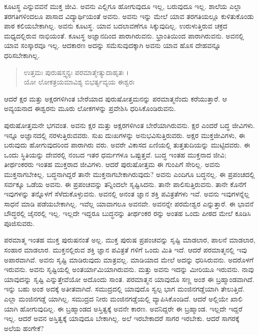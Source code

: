 ಕೂಟಸ್ಥ ಎನ್ನುವವನೆ ಮುಕ್ತ ಜೀವಿ. ಅವನು ಎಲ್ಲಿಗೂ ಹೋಗುವುದೂ ಇಲ್ಲ, ಬರುವುದೂ ಇಲ್ಲ. ಶಾಲೆಯ ಎಲ್ಲಾ ತರಗತಿಗಳಿಂದಲೂ ಪಾಸಾದ ವಿದ್ಯಾರ್ಥಿಯಂತೆ ಅವನು. ಅವನು ಇನ್ನು ಮೇಲೆ ಯಾವ ತರಗತಿಯಲ್ಲೂ ಕುಳಿತುಕೊಂಡು ಪಾಠ ಕಲಿಯಬೇಕಾಗಿಲ್ಲ. ಅವನು ಕೂಟಸ್ಥ. ಯಾವ ಬದಲಾವಣೆಗೂ ಸಿಕ್ಕುವುದಿಲ್ಲ. ಉರುಳುತ್ತಿರುವ ಚಕ್ರದ ಮಧ್ಯದಲ್ಲಿರುವ ನಾಭಿಯಂತೆ. ಕೂಟಸ್ಥ ಅಜ್ಞಾನದಿಂದ ಪಾರಾಗಿರುವನು. ಭ್ರಾಂತಿಯಿಂದ ಪಾರಾಗಿರುವನು. ಅವನಲ್ಲಿ ಯಾವ ಸಂಸ್ಕಾರವೂ ಇಲ್ಲ. ಆದಕಾರಣ ಅದನ್ನು ಸಮೆಸುವುದಕ್ಕಾಗಿ ಅವನು ಯಾವ ಹೊಸ ದೇಹವನ್ನೂ ಧರಿಸಬೇಕಾಗಿಲ್ಲ.

\begin{verse}
ಉತ್ತಮಃ ಪುರುಷಸ್ತ್ವನ್ಯಃ ಪರಮಾತ್ಮೇತ್ಯುದಾಹೃತಃ ।\\ಯೋ ಲೋಕತ್ರಯಮಾವಿಶ್ಯ ಬಿಭರ್ತ್ಯವ್ಯಯ ಈಶ್ವರಃ 
\end{verse}

{\small ಆದರೆ ಕ್ಷರ ಮತ್ತು ಅಕ್ಷರಗಳಿಗಿಂತ ಬೇರೆಯಾದ ಪುರುಷೋತ್ತಮನನ್ನು ಪರಮಾತ್ಮನೆಂದು ಕರೆಯುತ್ತಾರೆ. ಆ ಅವ್ಯಯನಾದ ಈಶ್ವರನು ಮೂರು ಲೋಕಗಳನ್ನು ಪ್ರವೇಶಿಸಿ ಧರಿಸಿಕೊಂಡಿರುವನು.}

ಪುರುಷೋತ್ತಮನೇ ಭಗವಂತ. ಅವನು ಕ್ಷರ ಮತ್ತು ಅಕ್ಷರಗಳಿಗಿಂತ ಬೇರೆಯಾಗಿರುವನು. ಕ್ಷರ ಎಂದರೆ ಬದ್ಧ ಜೀವಿಗಳು. ಇನ್ನೂ ಅಜ್ಞಾನದಲ್ಲಿ ನರಳುತ್ತಿರುವವರು. ಸುಖ ದುಃಖಗಳನ್ನು ಅನುಭವಿಸುತ್ತಿರುವರು. ಅಕ್ಷರ ಮುಕ್ತಜೀವಿಗಳು, ಈ ಬರುವುದು ಹೋಗುವುದರಿಂದ ಪಾರಾಗಿರು ವರು. ಅವರೇ ವಿಕಾಸದ ಏಣಿಯಲ್ಲಿ ತುತ್ತತುದಿಯನ್ನು ಮುಟ್ಟಿದವರು. ಈ ಒಂದು ಸ್ಥಿತಿಯನ್ನು ದೇವರಲ್ಲಿ ನಂಬದ ಇತರ ಧರ್ಮಗಳೂ ಒಪ್ಪುತ್ತವೆ. ಬುದ್ಧ ಇಂತಹ ಮುಕ್ತನಾದ ಜೀವಿ; ತೀರ್ಥಂಕರರು ಇಂತಹ ಮುಕ್ತರಾದ ಜೀವಿಗಳು. ಆದರೆ ಪುರುಷೋತ್ತಮ ಈ ಗುಂಪಿಗೆ ಸೇರಿಲ್ಲ. ಅವನು ಮುಕ್ತನಾಗಬೇಕಿಲ್ಲ. ಬದ್ಧನಾಗಿದ್ದರೆ ತಾನೇ ಮುಕ್ತನಾಗಬೇಕಾಗಿರುವುದು? ಅವನು ಎಂದಿಗೂ ಬದ್ಧನಲ್ಲ. ಈ ಪ್ರಪಂಚದಲ್ಲಿ ಸರ್ವಕ್ಕೂ ಒಡೆಯ ಅವನು. ಈ ಪ್ರಪಂಚವನ್ನು ತನ್ನಿಂದಲೇ ಸೃಷ್ಟಿಸಿದನು. ತಾನೇ ಪಾಲಿಸುತ್ತಿರುವನು. ತಾನೇ ಕೊನೆಗೆ ಇವುಗಳನ್ನು ತನ್ನೊಳಗೆ ಸೆಳೆದುಕೊಳ್ಳುವನು. ಅವನಲ್ಲಿ ಅನಂತ ಜ್ಞಾನ ಶಕ್ತಿ ಪವಿತ್ರತೆಗಳು ಇವೆ. ಅವನು ಇವುಗಳನ್ನೆಲ್ಲ ಸಾಧನೆ ಮಾಡಿ ಪಡೆಯಬೇಕಾಗಿಲ್ಲ. ಇವೆಲ್ಲ ಯಾವಾಗಲೂ ಅವನವೇ. ಅವನನ್ನೇ ಪರಮೇಶ್ವರ ಎನ್ನುತ್ತಾರೆ. ಈ ಭಾವನೆ ಬೌದ್ಧರಲ್ಲಿ ಜೈನರಲ್ಲಿ ಇಲ್ಲ. ಇಲ್ಲದೇ ಇದ್ದರೂ ಬುದ್ಧನನ್ನು ತೀರ್ಥಂಕರ ರನ್ನು ಅಂತಹ ಒಂದು ಪೀಠದ ಮೇಲೆ ಕೂಡಿಸಿ ಪೂಜಿಸುವರು.

ಪರಮಾತ್ಮ ಇಂತಹ ಮುಕ್ತ ಪುರುಷನಂತೆ ಅಲ್ಲ. ಮುಕ್ತ ಪುರುಷ ಪ್ರಪಂಚವನ್ನು ಸೃಷ್ಟಿ ಮಾಡಲಾರ, ಪಾಲನೆ ಮಾಡಲಾರ, ಸಂಹಾರ ಮಾಡಲಾರ. ಮುಕ್ತನಲ್ಲಿರುವ ಶಕ್ತಿ ಜ್ಞಾನ ಪವಿತ್ರತೆ ಗಳಿಗೆ ಒಂದು ಮಿತಿ ಇದೆ. ಆದರೆ ಪರಮಾತ್ಮನಲ್ಲಿ ಇವು ಅಪಾರವಾಗಿವೆ. ಅವನು ಸೃಷ್ಟಿ ಮಾಡಿರುವುದು ಮಾತ್ರವಲ್ಲ. ಮಾಡಿಯಾದ ಮೇಲೆ ಅದನ್ನು ಧರಿಸಿರುವನು. ಅದರೊಳಗೆ ಇರುವನು. ಅವನು ಸೃಷ್ಟಿಯಲ್ಲಿ ಅಂತರ್ಯಾಮಿಯಾಗಿರುವನು. ಮತ್ತು ಅವನು ಇದನ್ನು ಮೀರಿಯೂ ಇರುವನು. ನಾವು ಯಾವುದನ್ನು ಸೃಷ್ಟಿ ಎನ್ನುತ್ತೇವೆಯೋ ಅದೊಂದು ಸಾಂತ. ಪರಮಾತ್ಮನ ಯಾವುದೊ ಸಣ್ಣ ಅಂಶ ಈ ಬ್ರಹ್ಮಾಂಡವಾಗಿದೆ. ಇನ್ನು ಬಹು ಅಂಶ ಅದಕ್ಕೆ ಅತೀತವಾಗಿದೆ. ಸಮುದ್ರದಲ್ಲಿ ಯಾವುದೊ ಸ್ವಲ್ಪ ಭಾಗ ಮಂಜಿನಗಡ್ಡೆಯಾಗಿ ತೇಲುತ್ತಿದೆ. ಎಲ್ಲಾ ಮಂಜಿನಗಡ್ಡೆ ಯಾಗಿಲ್ಲ. ಸಮುದ್ರದ ನೀರು ಮಂಜಿನಗಡ್ಡೆಯಲ್ಲಿ ವ್ಯಾಪಿಸಿಕೊಂಡಿದೆ. ಆದರೆ ಅಲ್ಲಿಯೇ ಖಾಲಿ ಯಾಗಿ ಹೋಗುವುದಿಲ್ಲ. ಈ ಬ್ರಹ್ಮಾಂಡದ ಅಸ್ತಿತ್ವಕ್ಕೆ ಅವನೇ ಕಾರಣ. ಅವನಿದ್ದರೇ ಈ ಬ್ರಹ್ಮಾಂಡ. ಇಲ್ಲದೇ ಇದ್ದರೆ ಇಲ್ಲ. ಆದರೆ ಅವನ ಅಸ್ತಿತ್ವಕ್ಕೆ ಯಾವುದೂ ಬೇಕಾಗಿಲ್ಲ. ಅಲೆ ಇರಬೇಕಾದರೆ ಸಾಗರ ಇರಬೇಕು. ಆದರೆ ಸಾಗರಕ್ಕೆ ಅಲೆಯ ಹಂಗೇಕೆ?

